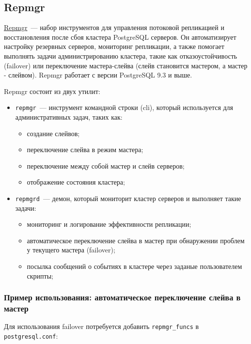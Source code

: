 \subsection{Repmgr}

\href{http://www.repmgr.org/}{Repmgr}~--- набор инструментов для управления потоковой репликацией и восстановления после сбоя кластера PostgreSQL серверов. Он автоматизирует настройку резервных серверов, мониторинг репликации, а также помогает выполнять задачи администрированию кластера, такие как отказоустойчивость (failover) или переключение мастера-слейва (слейв становится мастером, а мастер - слейвом). Repmgr работает с версии PostgreSQL 9.3 и выше.

Repmgr состоит из двух утилит:

\begin{itemize}
  \item \lstinline!repmgr!~--- инструмент командной строки (cli), который используется для административных задач, таких как:
  \begin{itemize}
    \item создание слейвов;
    \item переключение слейва в режим мастера;
    \item переключение между собой мастер и слейв серверов;
    \item отображение состояния кластера;
  \end{itemize}
  \item \lstinline!repmgrd!~--- демон, который мониторит кластер серверов и выполняет такие задачи:
  \begin{itemize}
    \item мониторинг и логирование эффективности репликации;
    \item автоматическое переключение слейва в мастер при обнаружении проблем у текущего мастера (failover);
    \item посылка сообщений о событиях в кластере через заданые пользователем скрипты;
  \end{itemize}
\end{itemize}

\subsubsection{Пример использования: автоматическое переключение слейва в мастер}

Для использования failover потребуется добавить \lstinline!repmgr_funcs! в \lstinline!postgresql.conf!:

